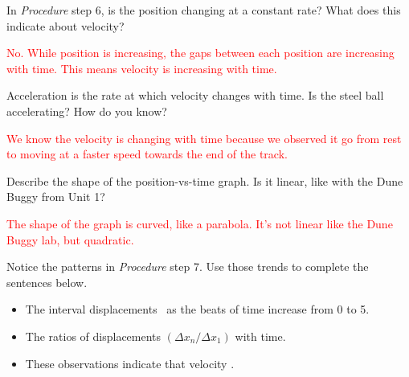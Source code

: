 \documentclass[answers]{exam}
\begin{document}
\begin{questions}
\question
In \textit{Procedure} step 6, is the position changing at a constant rate? What does this indicate about velocity?

\ifprintanswers
\textcolor{red}{No. While position is increasing, the gaps between each position are increasing with time. This means velocity is increasing with time.}
\else
\fillwithlines{21mm}
\fi

\question 
Acceleration is the rate at which velocity changes with time. Is the steel ball accelerating? How do you know?

\ifprintanswers
\textcolor{red}{We know the velocity is changing with time because we observed it go from rest to moving at a faster speed towards the end of the track.}
\else
\fillwithlines{21mm}
\fi


\question 
Describe the shape of the position-vs-time graph. Is it linear, like with the Dune Buggy from Unit 1?

\ifprintanswers
\textcolor{red}{The shape of the graph is curved, like a parabola. It's not linear like the Dune Buggy lab, but quadratic.}
\else
\fillwithlines{21mm}
\fi

\question
Notice the patterns in \textit{Procedure} step 7. Use those trends to complete the sentences below. 

\begin{itemize}[itemsep=2pt]
    \item The interval displacements \ as the beats of time increase from 0 to 5.
    \item The ratios of displacements $\left(\Delta x_n/\Delta x_1\right)$  with time.
    \item These observations indicate that velocity .
\end{itemize}

\question
{}
\end{questions}
\end{document}
